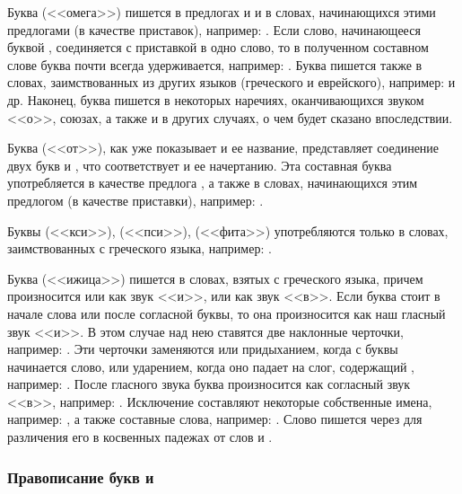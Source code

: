 \documentclass[11pt,a4paper,oneside]{memoir}
\begin{document}
        Буква {} (<<омега>>) пишется в предлогах {} и
        {} и в словах, начинающихся этими предлогами (в
        качестве приставок), например: {}. Если слово, начинающееся буквой {},
        соединяется с приставкой в одно слово, то в полученном
        составном слове буква {} почти всегда удерживается,
        например: {}. Буква {} пишется
        также в словах, заимствованных из других языков (греческого и
        еврейского), например: {} и др. Наконец, буква {} пишется в некоторых
        наречиях, оканчивающихся звуком <<о>>, союзах, а также и в
        других случаях, о чем будет сказано впоследствии.

        Буква {} (<<от>>), как уже показывает и ее название,
        представляет соединение двух букв {} и {}, что
        соответствует и ее начертанию. Эта составная буква
        употребляется в качестве предлога {}, а также в
        словах, начинающихся этим предлогом (в качестве приставки),
        например: {}.

        Буквы {} (<<кси>>), {} (<<пси>>), {}
        (<<фита>>) употребляются только в словах, заимствованных с
        греческого языка, например: {}.

        Буква {} (<<ижица>>) пишется в словах, взятых с
        греческого языка, причем произносится или как звук <<и>>, или
        как звук <<в>>. Если буква {} стоит в начале слова или
        после согласной буквы, то она произносится как наш гласный
        звук <<и>>. В этом случае над нею ставятся две наклонные
        черточки, например: {}. Эти черточки заменяются
        или придыханием, когда с буквы {} начинается слово,
        или ударением, когда оно падает на слог, содержащий
        {}, например: {}. После
        гласного звука буква {} произносится как согласный
        звук <<в>>, например: {}.
        Исключение составляют некоторые собственные имена, например:
        {}, а также составные слова, например:
        {}. Слово {} пишется через
        {} для различения его в косвенных падежах от слов
        {} и {}.

        \subsubsection{Правописание букв {\large{}} и {\large{}}}
\end{document}
